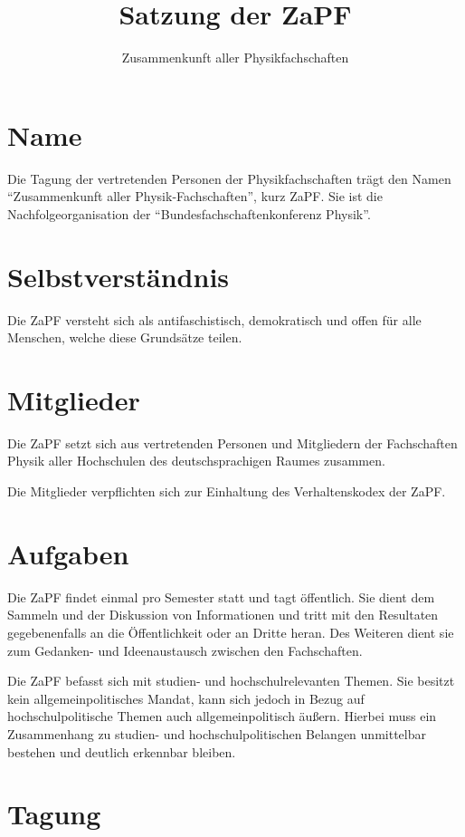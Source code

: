 \documentclass[
  a4paper,
  oneside]{scrartcl}
\title{Satzung der ZaPF}
\author{Zusammenkunft aller Physikfachschaften}
\date{}
\begin{document}
\maketitle

\section{Name}\label{name}

Die Tagung der vertretenden Personen der Physikfachschaften trägt den
Namen ``Zusammenkunft aller Physik-Fachschaften'', kurz ZaPF. Sie ist
die Nachfolgeorganisation der ``Bundesfachschaftenkonferenz Physik''.

\section{Selbstverständnis}\label{selbstverstuxe4ndnis}

Die ZaPF versteht sich als antifaschistisch, demokratisch und offen für
alle Menschen, welche diese Grundsätze teilen.

\section{Mitglieder}\label{mitglieder}

Die ZaPF setzt sich aus vertretenden Personen und Mitgliedern der
Fachschaften Physik aller Hochschulen des deutschsprachigen Raumes
zusammen.

Die Mitglieder verpflichten sich zur Einhaltung des Verhaltenskodex der
ZaPF.

\section{Aufgaben}\label{aufgaben}

Die ZaPF findet einmal pro Semester statt und tagt öffentlich. Sie dient
dem Sammeln und der Diskussion von Informationen und tritt mit den
Resultaten gegebenenfalls an die Öffentlichkeit oder an Dritte heran.
Des Weiteren dient sie zum Gedanken- und Ideenaustausch zwischen den
Fachschaften.

Die ZaPF befasst sich mit studien- und hochschulrelevanten Themen. Sie
besitzt kein allgemeinpolitisches Mandat, kann sich jedoch in Bezug auf
hochschulpolitische Themen auch allgemeinpolitisch äußern. Hierbei muss
ein Zusammenhang zu studien- und hochschulpolitischen Belangen
unmittelbar bestehen und deutlich erkennbar bleiben.

\section{Tagung}\label{tagung}
\end{document}
